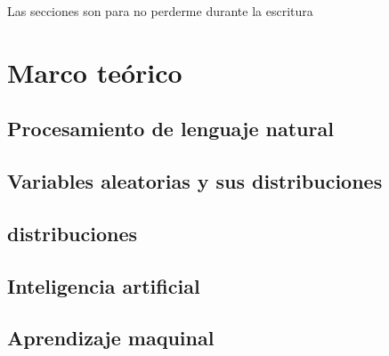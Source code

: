 \documentclass[12pt,letterpaper]{article}
\begin{document}
\maketitle
%
\tableofcontents
\pagebreak
Las secciones son para no perderme durante la escritura
\section {Marco teórico}\label{sec:marco}



\subsection {Procesamiento de lenguaje natural}\label{subsec:nlp}
\subsection {Variables aleatorias y sus distribuciones}\label{subsec:vayd}
\subsection {distribuciones}\label{subsec:dd}
\subsection {Inteligencia artificial}\label{subsec:intela}
\subsection {Aprendizaje maquinal}\label{subsec:machinel}
\end{document}

